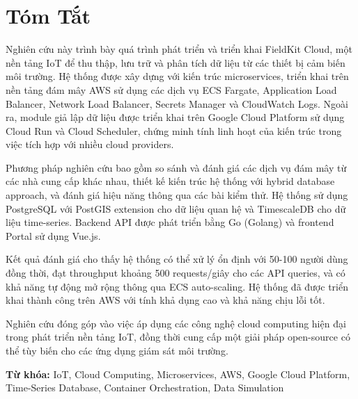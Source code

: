 \section*{Tóm Tắt}

Nghiên cứu này trình bày quá trình phát triển và triển khai FieldKit Cloud, một nền tảng IoT để thu thập, lưu trữ và phân tích dữ liệu từ các thiết bị cảm biến môi trường. Hệ thống được xây dựng với kiến trúc microservices, triển khai trên nền tảng đám mây AWS sử dụng các dịch vụ ECS Fargate, Application Load Balancer, Network Load Balancer, Secrets Manager và CloudWatch Logs. Ngoài ra, module giả lập dữ liệu được triển khai trên Google Cloud Platform sử dụng Cloud Run và Cloud Scheduler, chứng minh tính linh hoạt của kiến trúc trong việc tích hợp với nhiều cloud providers.

Phương pháp nghiên cứu bao gồm so sánh và đánh giá các dịch vụ đám mây từ các nhà cung cấp khác nhau, thiết kế kiến trúc hệ thống với hybrid database approach, và đánh giá hiệu năng thông qua các bài kiểm thử. Hệ thống sử dụng PostgreSQL với PostGIS extension cho dữ liệu quan hệ và TimescaleDB cho dữ liệu time-series. Backend API được phát triển bằng Go (Golang) và frontend Portal sử dụng Vue.js.

Kết quả đánh giá cho thấy hệ thống có thể xử lý ổn định với 50-100 người dùng đồng thời, đạt throughput khoảng 500 requests/giây cho các API queries, và có khả năng tự động mở rộng thông qua ECS auto-scaling. Hệ thống đã được triển khai thành công trên AWS với tính khả dụng cao và khả năng chịu lỗi tốt.

Nghiên cứu đóng góp vào việc áp dụng các công nghệ cloud computing hiện đại trong phát triển nền tảng IoT, đồng thời cung cấp một giải pháp open-source có thể tùy biến cho các ứng dụng giám sát môi trường.

\textbf{Từ khóa:} IoT, Cloud Computing, Microservices, AWS, Google Cloud Platform, Time-Series Database, Container Orchestration, Data Simulation

